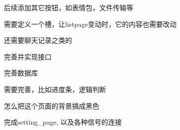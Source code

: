 
\begin{DoxyRefList}
\item[类 \mbox{\hyperlink{classChatBtm}{Chat\+Btm}} ]\label{todo__todo000005}%
%
后续添加其它按钮，如表情包，文件传输等  
\item[类 \mbox{\hyperlink{classChatMid}{Chat\+Mid}} ]\label{todo__todo000006}%
%
需要定义一个槽，让listpage变动时，它的内容也需要改动  
\item[成员 \mbox{\hyperlink{classChatPage_abb972431d66174680d488fadd8c6491a}{Chat\+Page::Slot\+List\+Change\+Idx}} (\mbox{\hyperlink{namespaceType_a9faf80af89bbcb86b6838c2be790d760}{Type\+::\+Identity}} identity, int idx)]\label{todo__todo000007}%
%
还需要聊天记录之类的  
\item[类 \mbox{\hyperlink{classCore}{Core}} ]\label{todo__todo000002}%
%
完善并实现接口  
\item[类 \mbox{\hyperlink{classCoreSql}{Core\+Sql}} ]\label{todo__todo000003}%
%
完善数据库  
\item[类 \mbox{\hyperlink{classFtpPage}{Ftp\+Page}} ]\label{todo__todo000008}%
%
需要完善，比如进度条，逻辑判断  
\item[文件 \mbox{\hyperlink{tool__page_8h}{tool\+\_\+page.h}} ]\label{todo__todo000009}%
%
怎么把这个页面的背景搞成黑色  
\item[类 \mbox{\hyperlink{classWidget}{Widget}} ]\label{todo__todo000004}%
%
完成setting\+\_\+page, 以及各种信号的连接 
\end{DoxyRefList}